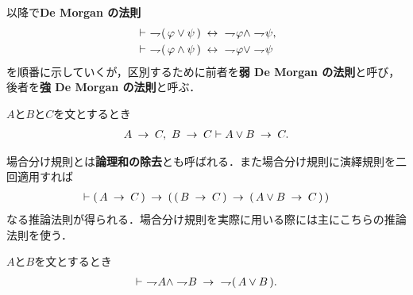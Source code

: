 	以降で{\bf De Morgan の法則}
	\begin{align}
		&\vdash\ \negation (\, \varphi \vee \psi\, ) \lrarrow\ \negation \varphi
		\wedge \negation \psi, \\
		&\vdash\ \negation (\, \varphi \wedge \psi\, ) \lrarrow\ \negation \varphi
		\vee \negation \psi
	\end{align}
	を順番に示していくが，区別するために前者を{\bf 弱 De Morgan の法則}と呼び，
	後者を{\bf 強 De Morgan の法則}と呼ぶ．
	
	\begin{screen}
		\begin{logicalaxm}[場合分け規則]
		\label{logicalaxm:elimination_of_disjunction}
			$A$と$B$と$C$を文とするとき
			\begin{align}
				A \hspace{0.25em}\rightarrow\hspace{0.25em} C,\ B \hspace{0.25em}\rightarrow\hspace{0.25em} C \vdash A \vee B \hspace{0.25em}\rightarrow\hspace{0.25em} C.
			\end{align}
		\end{logicalaxm}
	\end{screen}
	
	場合分け規則とは{\bf 論理和の除去}とも呼ばれる．また場合分け規則に演繹規則を二回適用すれば
	\begin{align}
		\vdash (\, A \hspace{0.25em}\rightarrow\hspace{0.25em} C\, ) 
		\hspace{0.25em}\rightarrow\hspace{0.25em} (\, (\, B \hspace{0.25em}\rightarrow\hspace{0.25em} C\, ) \hspace{0.25em}\rightarrow\hspace{0.25em} (\, A \vee B \hspace{0.25em}\rightarrow\hspace{0.25em} C\, )\, )
	\end{align}
	なる推論法則が得られる．場合分け規則を実際に用いる際には主にこちらの推論法則を使う．
	
	\begin{screen}
		\begin{logicalthm}
		\label{logicalthm:weak_De_Morgan_law_1}
			$A$と$B$を文とするとき
			\begin{align}
				\vdash\ \rightharpoondown\hspace{-0.25em} A \wedge \rightharpoondown\hspace{-0.25em} B
				\hspace{0.25em}\rightarrow\hspace{0.25em}\ \rightharpoondown\hspace{-0.25em} (\, A \vee B\, ).
			\end{align}
		\end{logicalthm}
	\end{screen}
	
